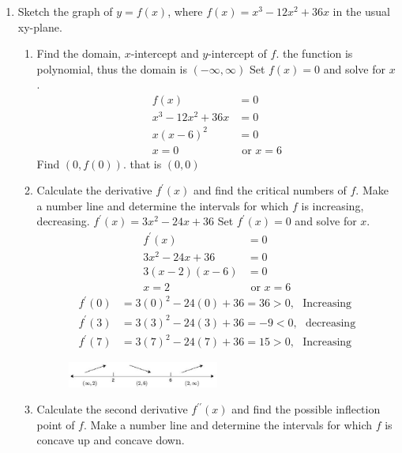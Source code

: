 \documentclass{exam}
\begin{document}
\begin{enumerate}
\item Sketch the graph of $y = f(x)$, where $f(x) = x^{3} - 12x^{2} + 36x$ in the usual xy-plane.
\begin{enumerate}
  \item Find the domain, $x$-intercept and $y$-intercept of $f$.
     the function is polynomial, thus the domain is $(-\infty, \infty)$
     Set $f(x)=0$ and solve for $x$.
\begin{align*}
                   f(x)& = 0\\
 x^{3} - 12x^{2} + 36x & = 0\\
            x(x-6)^{2} & = 0\\
                     x=0 & \text{ or } x=6
\end{align*}
     Find $(0, f(0))$. that is $(0,0)$
  \item Calculate the derivative $f^{\prime}(x)$ and find the critical numbers of $f$. Make a number line and determine the intervals for which $f$ is increasing, decreasing.
   $f^{\prime}(x)=3x^{2}-24x+36$
   Set $f^{\prime}(x)=0$ and solve for $x$.
\begin{align*}
                   f^{\prime}(x)& = 0\\
                  3x^{2}-24x+36 & = 0\\
            3(x-2)(x-6) & = 0\\
                     x=2 & \text{ or } x=6
\end{align*}
\begin{align*}
 f^{\prime}(0)& = 3(0)^{2}-24(0)+36=36>0, \ \ \ \text{Increasing}\\
f^{\prime}(3)& = 3(3)^{2}-24(3)+36=-9<0, \ \ \ \text{decreasing}\\
f^{\prime}(7)& = 3(7)^{2}-24(7)+36=15>0, \ \ \  \text{Increasing}
\end{align*} 
\begin{figure}[H]
\centering
\includegraphics[width=0.5\textwidth]{Diagram_1.eps}
\end{figure}
  \item Calculate the second derivative $f^{\prime\prime}(x)$ and find the possible inflection point of $f$. Make a number line and determine the intervals for which $f$ is concave up and concave down.

\end{enumerate}
\end{enumerate}
\end{document}
